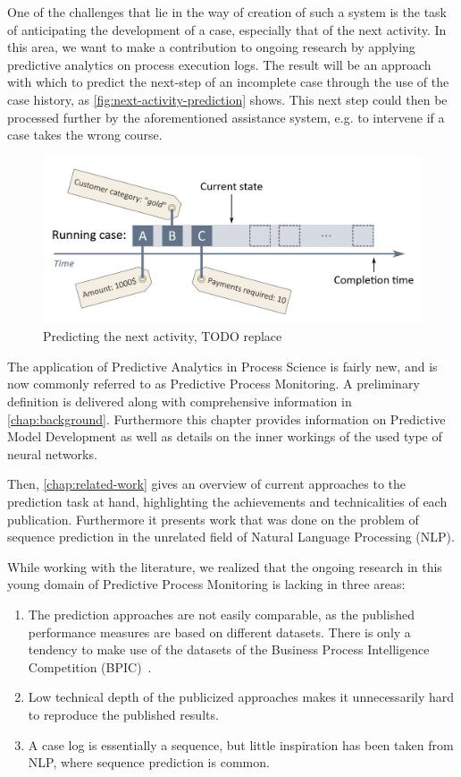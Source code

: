 One of the challenges that lie in the way of creation of such a system is the task of anticipating the development of a case, especially that of the next activity. In this area, we want to make a contribution to ongoing research by applying predictive analytics on process execution logs. The result will be an approach with which to predict the next-step of an incomplete case through the use of the case history, as \autoref{fig:next-activity-prediction} shows. This next step could then be processed further by the aforementioned assistance system, e.g. to intervene if a case takes the wrong course.\\

\begin{figure}
    \centering
    \includegraphics[width=\textwidth]{gfx/next-activity.png}
    \caption{Predicting the next activity, TODO replace}
    \label{fig:next-activity-prediction}
\end{figure}

The application of Predictive Analytics in Process Science is fairly new, and is now commonly referred to as Predictive Process Monitoring. A preliminary definition is delivered along with comprehensive information in \autoref{chap:background}. Furthermore this chapter provides information on Predictive Model Development as well as details on the inner workings of the used type of neural networks.

Then, \autoref{chap:related-work} gives an overview of current approaches to the prediction task at hand, highlighting the achievements and technicalities of each publication. Furthermore it presents work that was done on the problem of sequence prediction in the unrelated field of Natural Language Processing (NLP).

While working with the literature, we realized that the ongoing research in this young domain of Predictive Process Monitoring is lacking in three areas:

\begin{enumerate}
    \item The prediction approaches are not easily comparable, as the published performance measures are based on different datasets. There is only a tendency to make use of the datasets of the Business Process Intelligence Competition (BPIC)~\cite{BPIC2011, BPIC2012, BPIC2017}.
    \item Low technical depth of the publicized approaches makes it unnecessarily hard to reproduce the published results.
    \item A case log is essentially a sequence, but little inspiration has been taken from NLP, where sequence prediction is common.
\end{enumerate}

